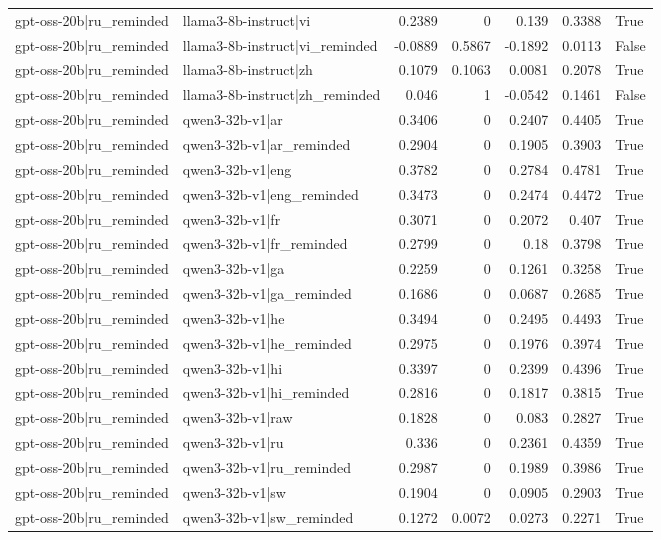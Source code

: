 \begin{table}
\begin{tabular}{l l r r r r l}
gpt-oss-20b|ru_reminded & llama3-8b-instruct|vi & 0.2389 & 0 & 0.139 & 0.3388 & True \\
gpt-oss-20b|ru_reminded & llama3-8b-instruct|vi_reminded & -0.0889 & 0.5867 & -0.1892 & 0.0113 & False \\
gpt-oss-20b|ru_reminded & llama3-8b-instruct|zh & 0.1079 & 0.1063 & 0.0081 & 0.2078 & True \\
gpt-oss-20b|ru_reminded & llama3-8b-instruct|zh_reminded & 0.046 & 1 & -0.0542 & 0.1461 & False \\
gpt-oss-20b|ru_reminded & qwen3-32b-v1|ar & 0.3406 & 0 & 0.2407 & 0.4405 & True \\
gpt-oss-20b|ru_reminded & qwen3-32b-v1|ar_reminded & 0.2904 & 0 & 0.1905 & 0.3903 & True \\
gpt-oss-20b|ru_reminded & qwen3-32b-v1|eng & 0.3782 & 0 & 0.2784 & 0.4781 & True \\
gpt-oss-20b|ru_reminded & qwen3-32b-v1|eng_reminded & 0.3473 & 0 & 0.2474 & 0.4472 & True \\
gpt-oss-20b|ru_reminded & qwen3-32b-v1|fr & 0.3071 & 0 & 0.2072 & 0.407 & True \\
gpt-oss-20b|ru_reminded & qwen3-32b-v1|fr_reminded & 0.2799 & 0 & 0.18 & 0.3798 & True \\
gpt-oss-20b|ru_reminded & qwen3-32b-v1|ga & 0.2259 & 0 & 0.1261 & 0.3258 & True \\
gpt-oss-20b|ru_reminded & qwen3-32b-v1|ga_reminded & 0.1686 & 0 & 0.0687 & 0.2685 & True \\
gpt-oss-20b|ru_reminded & qwen3-32b-v1|he & 0.3494 & 0 & 0.2495 & 0.4493 & True \\
gpt-oss-20b|ru_reminded & qwen3-32b-v1|he_reminded & 0.2975 & 0 & 0.1976 & 0.3974 & True \\
gpt-oss-20b|ru_reminded & qwen3-32b-v1|hi & 0.3397 & 0 & 0.2399 & 0.4396 & True \\
gpt-oss-20b|ru_reminded & qwen3-32b-v1|hi_reminded & 0.2816 & 0 & 0.1817 & 0.3815 & True \\
gpt-oss-20b|ru_reminded & qwen3-32b-v1|raw & 0.1828 & 0 & 0.083 & 0.2827 & True \\
gpt-oss-20b|ru_reminded & qwen3-32b-v1|ru & 0.336 & 0 & 0.2361 & 0.4359 & True \\
gpt-oss-20b|ru_reminded & qwen3-32b-v1|ru_reminded & 0.2987 & 0 & 0.1989 & 0.3986 & True \\
gpt-oss-20b|ru_reminded & qwen3-32b-v1|sw & 0.1904 & 0 & 0.0905 & 0.2903 & True \\
gpt-oss-20b|ru_reminded & qwen3-32b-v1|sw_reminded & 0.1272 & 0.0072 & 0.0273 & 0.2271 & True \\

\end{tabular}
\end{table}
